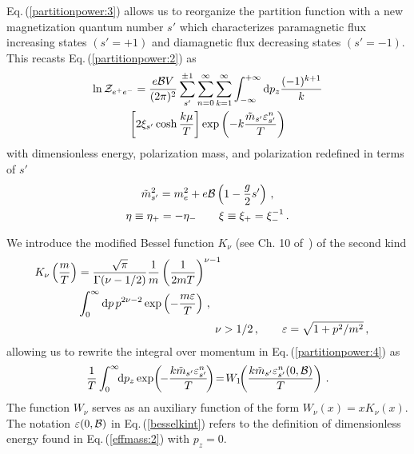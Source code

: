 \documentclass[aps,prd,floatfix,reprint]{revtex4-2}
\newcommand{\req}[1]{Eq.\,(\ref{#1})}
\begin{document}
\req{partitionpower:3} allows us to reorganize the partition function with a new magnetization quantum number $s'$ which characterizes paramagnetic flux increasing states $(s'=+1)$ and diamagnetic flux decreasing states $(s'=-1)$. This recasts \req{partitionpower:2} as
\begin{multline}
    \label{partitionpower:4}
    \ln{{\cal Z}_{e^{+}e^{-}}}=\frac{e{\cal B}V}{(2\pi)^{2}}\sum_{s'}^{\pm1}\sum_{n=0}^{\infty}\sum_{k=1}^{\infty}\int_{-\infty}^{+\infty}{\rm d}p_{z}\frac{(-1)^{k+1}}{k}\\
    \left[2\xi_{s'}\cosh\frac{k\mu}{T}\right]\exp\left(-k\frac{{\tilde m}_{s'}\varepsilon_{s'}^{n}}{T}\right)
\end{multline}
with dimensionless energy, polarization mass, and polarization redefined in terms of $s'$
\begin{gather}
    {\tilde m}_{s'}^{2}=m_{e}^{2}+e{\cal B}\left(1-\frac{g}{2}s'\right)\,,\\
    \eta\equiv\eta_{+}=-\eta_{-}\qquad\xi\equiv\xi_{+}=\xi_{-}^{-1}\,.
\end{gather}

We introduce the modified Bessel function $K_{\nu}$ (see Ch. 10 of~\cite{Letessier:2002ony}) of the second kind
\begin{align}
\begin{split}
\label{besselk}
K_{\nu}\left(\frac{m}{T}\right)&=\frac{\sqrt{\pi}}{\Gamma(\nu-1/2)}\frac{1}{m}\left(\frac{1}{2mT}\right)^{\nu-1}\\
&\int_{0}^{\infty}{\rm d}p\,p^{2\nu-2}\exp\left({-\frac{m\varepsilon}{T}}\right)\,,
\end{split}\\
\nu&>1/2\,,\qquad\varepsilon=\sqrt{1+p^{2}/m^{2}}\,,
\end{align}
allowing us to rewrite the integral over momentum in \req{partitionpower:4} as
\begin{align}
 \label{besselkint}
 \frac{1}{T}\int_{0}^{\infty}\!\!{\rm d}p_{z}\exp\!\left(\!{-\frac{k{\tilde m}_{s'}\varepsilon_{s'}^{n}}{T}}\!\right)\!=\!W_{1}\!\!\left(\frac{k{\tilde m}_{s'}\varepsilon_{s'}^{n}(0,{\cal B})}{T}\right)\,.
\end{align}
The function $W_{\nu}$ serves as an auxiliary function of the form $W_{\nu}(x)=xK_{\nu}(x)$. The notation $\varepsilon(0,{\cal B})$ in \req{besselkint} refers to the definition of dimensionless energy found in \req{effmass:2} with $p_{z}=0$.
\end{document}
